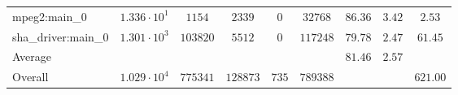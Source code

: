 \begin{tabular}{|l|c|c|c|c|c|c|c|c|}
mpeg2:main\_0           & $ 1.336 \cdot 10^{1} $ & $ 1154   $ & $ 2339   $ & $ 0   $ & $ 32768  $ & $ 86.36       $ & $ 3.42    $ & $ 2.53    $ \\
sha\_driver:main\_0     & $ 1.301 \cdot 10^{3} $ & $ 103820 $ & $ 5512   $ & $ 0   $ & $ 117248 $ & $ 79.78       $ & $ 2.47    $ & $ 61.45   $ \\
\hline
Average                 & $                    $ & $        $ & $        $ & $     $ & $        $ & $ 81.46       $ & $ 2.57    $ & $         $ \\
\hline
Overall                 & $ 1.029 \cdot 10^{4} $ & $ 775341 $ & $ 128873 $ & $ 735 $ & $ 789388 $ & $             $ & $         $ & $ 621.00  $ \\
\hline
\end{tabular}
